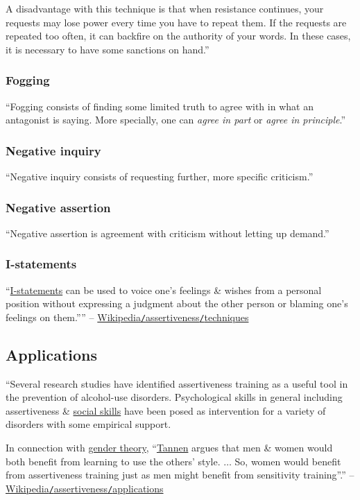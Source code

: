 \documentclass[oneside]{book}
\numberwithin{equation}{section}
\begin{document}
A disadvantage with this technique is that when resistance continues, your requests may lose power every time you have to repeat them. If the requests are repeated too often, it can backfire on the authority of your words. In these cases, it is necessary to have some sanctions on hand.''

\subsubsection{Fogging}
``Fogging consists of finding some limited truth to agree with in what an antagonist is saying. More specially, one can \textit{agree in part} or \textit{agree in principle}.''

\subsubsection{Negative inquiry}
``Negative inquiry consists of requesting further, more specific criticism.''

\subsubsection{Negative assertion}
``Negative assertion is agreement with criticism without letting up demand.''

\subsubsection{I-statements}
``\href{https://en.wikipedia.org/wiki/I-statements}{I-statements} can be used to voice one's feelings \& wishes from a personal position without expressing a judgment about the other person or blaming one's feelings on them.'''' -- \href{https://en.wikipedia.org/wiki/Assertiveness#Techniques}{Wikipedia\texttt{/}assertiveness\texttt{/}techniques}

\subsection{Applications}
``Several research studies have identified assertiveness training as a useful tool in the prevention of alcohol-use disorders. Psychological skills in general including assertiveness \& \href{https://en.wikipedia.org/wiki/Social_skills}{social skills} have been posed as intervention for a variety of disorders with some empirical support.

In connection with \href{https://en.wikipedia.org/wiki/Gender_theory}{gender theory}, ``\href{https://en.wikipedia.org/wiki/Deborah_Tannen}{Tannen} argues that men \& women would both benefit from learning to use the others' style. $\ldots$ So, women would benefit from assertiveness training just as men might benefit from sensitivity training''.'' -- \href{https://en.wikipedia.org/wiki/Assertiveness#Applications}{Wikipedia\texttt{/}assertiveness\texttt{/}applications}
\end{document}
